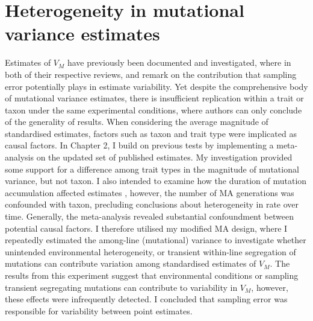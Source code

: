 \section{Heterogeneity in mutational variance estimates}
Estimates of $V_M$ have previously been documented and investigated, where in both of their respective reviews, \citet{Lync99} and \citet{Houl96} remark on the contribution that sampling error potentially plays in estimate variability. Yet despite the comprehensive body of mutational variance estimates, there is insufficient replication within a trait or taxon under the same experimental conditions, where authors can only conclude of the generality of results. When considering the average magnitude of standardised estimates, factors such as taxon \citep{Lync99, Hall09} and trait type \citep{Houl96, Houl98} were implicated as causal factors. In Chapter 2, I build on previous tests by implementing a meta-analysis on the updated set of published estimates. My investigation provided some support for a difference among trait types in the magnitude of mutational variance, but not taxon. I also intended to examine how the duration of mutation accumulation affected estimates \citep{Lync86,Mack95}, however, the number of MA generations was confounded with taxon, precluding conclusions about heterogeneity in rate over time. Generally, the meta-analysis revealed substantial confoundment between potential causal factors. I therefore utilised my modified MA design, where I repeatedly estimated the among-line (mutational) variance to investigate whether unintended environmental heterogeneity, or transient within-line segregation of mutations can contribute variation among standardised estimates of $V_M$. The results from this experiment suggest that environmental conditions or sampling transient segregating mutations can contribute to variability in $V_M$, however, these effects were infrequently detected. I concluded that sampling error was responsible for variability between point estimates. \par

